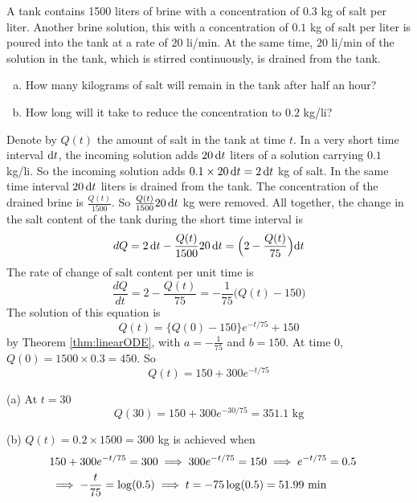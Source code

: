 \begin{eg}\label{eg:SDEmixingB}
A tank contains 1500 liters of brine with a concentration of $0.3$ kg of
salt per liter. Another brine solution, this with a concentration of
$0.1$ kg of salt per liter is poured into the tank at a rate of $20$ li/min.
At the same time, $20$ li/min of the solution in the tank, which is stirred
continuously, is drained from the tank.
\begin{enumerate}[(a)]
\item How many kilograms of salt will remain in the tank after
half an hour?
\item How long will it take to reduce the concentration to $0.2$
kg/li?
\end{enumerate}

\soln
Denote by $Q(t)$ the amount of salt in the tank at time $t$.
In a very short time interval $\mathrm{d}t$, the incoming solution adds $20\, \mathrm{d}t$
liters of a solution carrying $0.1$ kg/li. So the incoming solution adds
$0.1\times 20\, \mathrm{d}t=2\, \mathrm{d}t$ kg of salt. In the same time interval
$20\, \mathrm{d}t$ liters is drained from the tank. The concentration of the
drained brine is $\frac{Q(t)}{1500}$. So $\frac{Q(t)}{1500} 20\, \mathrm{d}t$ kg were
removed. All together, the change in the salt content of the tank during
the short time interval is
\begin{equation*}
dQ=2\, \mathrm{d}t-\frac{Q(t)}{1500} 20\, \mathrm{d}t
=\Big(2-\frac{Q(t)}{75}\Big) \mathrm{d}t
\end{equation*}
The rate of change of salt content per unit time is
\begin{equation*}
\frac{dQ}{dt}=2-\frac{Q(t)}{75}
=-\frac{1}{75}\big(Q(t)-150\big)
\end{equation*}
The solution of this equation  is
\begin{equation*}
Q(t)=\big\{Q(0)-150\big\}e^{-t/75} + 150
\end{equation*}
by Theorem \ref{thm:linearODE}, with $a=-\frac{1}{75}$ and $b=150$.
At time $0$, $Q(0)=1500\times 0.3=450$. So
\begin{equation*}
Q(t)=150+300e^{-t/75}
\end{equation*}

\noindent (a) At $t=30$
\begin{equation*}
Q(30)=150+300e^{-30/75}=\text{351.1 kg}
\end{equation*}

\noindent (b) $Q(t)=0.2\times 1500=300$ kg is achieved when
\begin{align*}
&150+300e^{-t/75}=300\implies 300e^{-t/75}=150
\implies e^{-t/75}=0.5\cr
&\implies -\frac{t}{75}=\log (0.5)
\implies t=-75\log (0.5)=\text{51.99 min}
\end{align*}
\end{eg}

